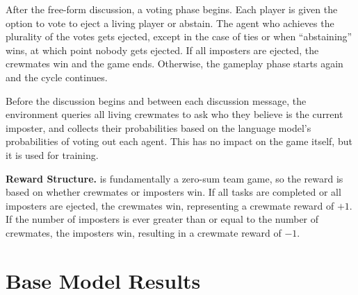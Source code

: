 
After the free-form discussion, a voting phase begins. Each player is given the option to vote to eject a living player or abstain. The agent who achieves the plurality of the votes gets ejected, except in the case of ties or when ``abstaining'' wins, at which point nobody gets ejected. If all imposters are ejected, the crewmates win and the game ends. Otherwise, the gameplay phase starts again and the cycle continues.

Before the discussion begins and between each discussion message, the environment queries all living crewmates to ask who they believe is the current imposter, and collects their probabilities based on the language model's probabilities of voting out each agent. This has no impact on the game itself, but it is used for training.

\smallskip

\noindent \textbf{Reward Structure.} \acro is fundamentally a zero-sum team game, so the reward is based on whether crewmates or imposters win. If all tasks are completed or all imposters are ejected, the crewmates win, representing a crewmate reward of $+1$. If the number of imposters is ever greater than or equal to the number of crewmates, the imposters win, resulting in a crewmate reward of $-1$.


\pagebreak

\section{Base Model Results}
\label{app:base}

